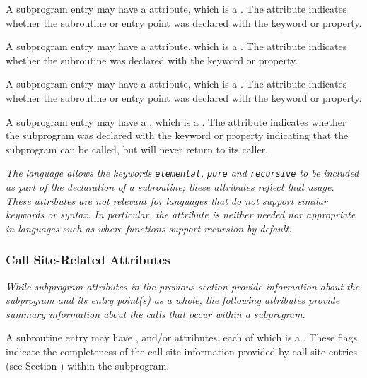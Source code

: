A subprogram entry may have 
a\hypertarget{chap:DWATelementalelementalpropertyofasubroutine}{}
\DWATelementalDEFN{} attribute, 
which is a . 
The attribute indicates whether the subroutine
or entry point was declared with the  keyword
or property.

A\hypertarget{chap:DWATpurepurepropertyofasubroutine}{}
subprogram entry may have a
\DWATpureDEFN{} attribute, which is
a . 
The attribute indicates whether the subroutine was
declared with the  keyword or property.

A\hypertarget{chap:DWATrecursiverecursivepropertyofasubroutine}{}
subprogram entry may have a 
\DWATrecursiveDEFN{} attribute, which
is a . 
The attribute indicates whether the subroutine
or entry point was declared with the  keyword
or property.

A subprogram entry may have a 
\DWATnoreturnDEFN{}
, 
which is a \CLASSflag. The attribute 
indicates whether the subprogram was declared with the  keyword or property 
indicating that the subprogram can be called, but will never return to its caller.

\textit{The  
language allows the keywords \texttt{elemental}, \texttt{pure}
and \texttt{recursive} to be included as part of the declaration of
a subroutine; these attributes reflect that usage. These
attributes are not relevant for languages that do not support
similar keywords or syntax. In particular, the \DWATrecursiveNAME{}
attribute is neither needed nor appropriate in languages such
as  where functions support recursion by default.}


\subsubsection{Call Site-Related Attributes}
\textit{While subprogram attributes in the previous section provide
information about the subprogram and its entry point(s) as a whole,
the following attributes provide summary information about the calls
that occur within a subprogram.}

A subroutine entry may have \DWATcallalltailcalls, 
\DWATcallallcalls{} and/or \DWATcallallsourcecalls{} 
attributes, each of which is a \CLASSflag.
These flags indicate the completeness of the call site 
information provided by call site entries (see 
Section ) within the subprogram.


